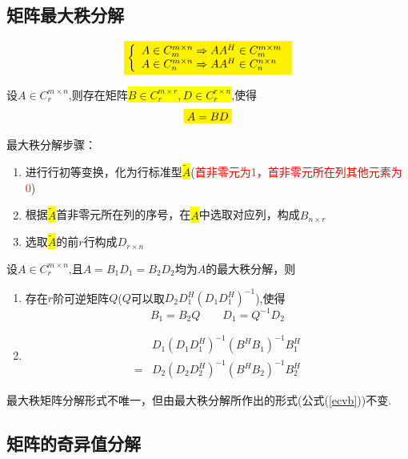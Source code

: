 \subsection{矩阵最大秩分解}
\[
\colorbox{yellow}{$
	\left\{\begin{array}{l}
		A\in C^{m\times n}_m \Rightarrow AA^H\in C^{m\times m}_m \\
		A\in C^{m\times n}_n \Rightarrow AA^H\in C^{n\times n}_n \\
	\end{array}\right.
	$}
\]

\begin{theorem}[最大秩分解]
	设$A\in C^{m\times n}_r$,则存在矩阵\colorbox{yellow}{$B\in C^{m\times r}_r,D\in C^{r\times n}_r$},使得
	\[
			\colorbox{yellow}{$	A=BD$}
	\]
\end{theorem}
\noindent 最大秩分解步骤：
\begin{enumerate}
\item 进行行初等变换，化为行标准型\colorbox{yellow}{$\tilde{A}$}(\textcolor{red}{首非零元为1，首非零元所在列其他元素为0})
\item 根据\colorbox{yellow}{$\tilde{A}$}首非零元所在列的序号，在\colorbox{yellow}{$A$}中选取对应列，构成$B_{n\times r}$
\item 选取\colorbox{yellow}{$\tilde{A}$}的前$r$行构成$D_{r\times n}$
\end{enumerate}

\begin{theorem}
	设$A\in C^{m\times n}_r$,且$A=B_1D_1=B_2D_2$均为$A$的最大秩分解，则
	\begin{enumerate}
		\item 存在$r$阶可逆矩阵$Q$($Q$可以取$D_2D_1^H(D_1D_1^H)^{-1}$),使得
		\[
		B_1=B_2Q\qquad D_1=Q^{-1}D_2
		\]
		\item\begin{equation}
		\label{ecvb}
		\begin{split}
			&D_1(D_1D_1^H)^{-1}(B^{H}B_1)^{-1}B_1^H\\
			=&D_2(D_2D_2^H)^{-1}(B^{H}B_2)^{-1}B_2^H
		\end{split}
\end{equation}
	\end{enumerate}
\end{theorem}
\begin{note}
	最大秩矩阵分解形式不唯一，但由最大秩分解所作出的形式(公式(\ref{ecvb}))不变.
\end{note}


\subsection{矩阵的奇异值分解}

